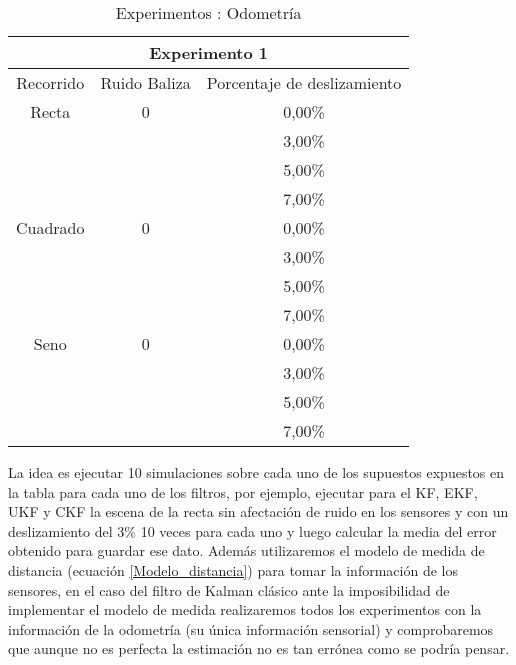 \begin{table}[ht!]
\caption{Experimentos : Odometría}
\begin{center}
\begin{tabular}{|l|l|c|l|}
\hline
\multicolumn{ 4}{|c|}{Experimento 1} \\ \hline
\multicolumn{1}{|c|}{Recorrido} & \multicolumn{1}{c|}{Ruido Baliza} & \multicolumn{ 2}{c|}{Porcentaje de deslizamiento} \\ \hline
\multicolumn{ 1}{|c|}{Recta} & \multicolumn{ 1}{c|}{0} & \multicolumn{ 2}{c|}{0,00\%} \\ \cline{ 3- 4}
\multicolumn{ 1}{|l|}{} & \multicolumn{ 1}{l|}{} & \multicolumn{ 2}{c|}{3,00\%} \\ \cline{ 3- 4}
\multicolumn{ 1}{|l|}{} & \multicolumn{ 1}{l|}{} & \multicolumn{ 2}{c|}{5,00\%} \\ \cline{ 3- 4}
\multicolumn{ 1}{|l|}{} & \multicolumn{ 1}{l|}{} & \multicolumn{ 2}{c|}{7,00\%} \\ \hline
\multicolumn{ 1}{|c|}{Cuadrado} & \multicolumn{ 1}{c|}{0} & \multicolumn{ 2}{c|}{0,00\%} \\ \cline{ 3- 4}
\multicolumn{ 1}{|l|}{} & \multicolumn{ 1}{l|}{} & \multicolumn{ 2}{c|}{3,00\%} \\ \cline{ 3- 4}
\multicolumn{ 1}{|l|}{} & \multicolumn{ 1}{l|}{} & \multicolumn{ 2}{c|}{5,00\%} \\ \cline{ 3- 4}
\multicolumn{ 1}{|l|}{} & \multicolumn{ 1}{l|}{} & \multicolumn{ 2}{c|}{7,00\%} \\ \hline
\multicolumn{ 1}{|c|}{Seno} & \multicolumn{ 1}{c|}{0} & \multicolumn{ 2}{c|}{0,00\%} \\ \cline{ 3- 4}
\multicolumn{ 1}{|l|}{} & \multicolumn{ 1}{l|}{} & \multicolumn{ 2}{c|}{3,00\%} \\ \cline{ 3- 4}
\multicolumn{ 1}{|l|}{} & \multicolumn{ 1}{l|}{} & \multicolumn{ 2}{c|}{5,00\%} \\ \cline{ 3- 4}
\multicolumn{ 1}{|l|}{} & \multicolumn{ 1}{l|}{} & \multicolumn{ 2}{c|}{7,00\%} \\ \hline
\end{tabular}
\end{center}
\label{tabla:exp_odometria}
\end{table}

La idea es ejecutar 10 simulaciones sobre cada uno de los supuestos expuestos en la tabla para cada uno de los filtros, por ejemplo, ejecutar para el KF, EKF, UKF y CKF la escena de la recta sin afectación de ruido en los sensores y con un deslizamiento del $3\%$ 10 veces para cada uno y luego calcular la media del error obtenido para guardar ese dato. 
Además utilizaremos el modelo de medida de distancia (ecuación \ref{Modelo_distancia}) para tomar la información de los sensores, en el caso del filtro de Kalman clásico ante la imposibilidad de implementar el modelo de medida realizaremos todos los experimentos con la información de la odometría (su única información sensorial) y comprobaremos que aunque no es perfecta la estimación no es tan errónea como se podría pensar.
